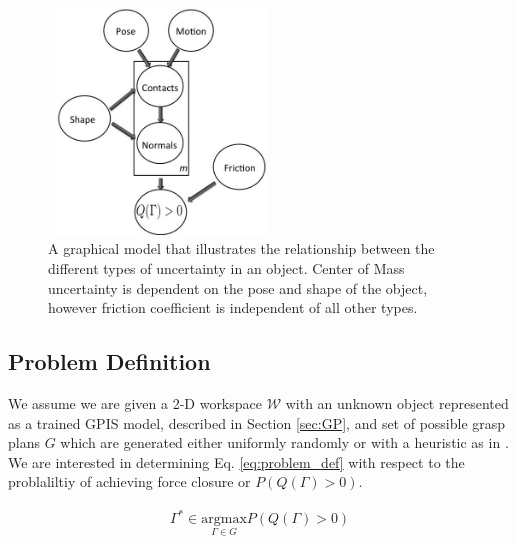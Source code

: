 \documentclass[journal,transmag]{IEEEtran}%
\begin{document}
\begin{figure}[ht!]
\centering
\includegraphics[width = 6cm, height = 6cm]{figures/Slide8.jpg}
\caption{A graphical model that illustrates the relationship between the different types of uncertainty in an object. Center of Mass uncertainty is dependent on the pose and shape of the object, however friction coefficient is independent of all other types. }
\vspace*{-10pt}
\label{fig:graphical_model}
\end{figure}





\subsection{Problem Definition}

We assume we are given a 2-D workspace $\mathcal{W}$ with an unknown object represented as a trained GPIS model, described in Section \ref{sec:GP}, and set of possible grasp plans $G$ which are generated either uniformly randomly or with a heuristic as in \cite{mahler2015gp}.
We are interested in determining Eq. \ref{eq:problem_def} with respect to the problaliltiy of achieving force closure or $P(Q(\Gamma) > 0)$. 

\vspace{-2ex}
\begin{align}\label{eq:problem_def}
\Gamma^* \in \underset{\Gamma \in G}{\mbox{argmax}} P(Q(\Gamma)>0)
\end{align}
\end{document}
